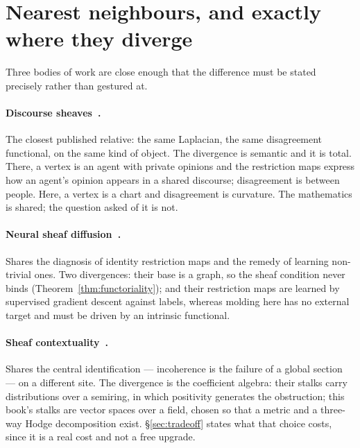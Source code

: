 \begin{center}
\begin{tikzpicture}
\end{tikzpicture}
\label{fig:litgraph}
\end{center}

\section{Nearest neighbours, and exactly where they diverge}
\label{sec:neighbours}

Three bodies of work are close enough that the difference must be stated
precisely rather than gestured at.

\paragraph{Discourse sheaves~\cite{HansenGhristOpinion}.} The closest
published relative: the same Laplacian, the same disagreement functional, on
the same kind of object. The divergence is semantic and it is total. There, a
vertex is an agent with private opinions and the restriction maps express how
an agent's opinion appears in a shared discourse; disagreement is between
people. Here, a vertex is a chart and disagreement is curvature. The
mathematics is shared; the question asked of it is not.

\paragraph{Neural sheaf diffusion~\cite{BodnarSheaf}.} Shares the diagnosis of
identity restriction maps and the remedy of learning non-trivial ones. Two
divergences: their base is a graph, so the sheaf condition never binds
(Theorem~\ref{thm:functoriality}); and their restriction maps are learned by
supervised gradient descent against labels, whereas molding here has no
external target and must be driven by an intrinsic functional.

\paragraph{Sheaf contextuality~\cite{AbramskyBrandenburger}.} Shares the
central identification --- incoherence is the failure of a global section ---
on a different site. The divergence is the coefficient algebra: their stalks
carry distributions over a semiring, in which positivity generates the
obstruction; this book's stalks are vector spaces over a field, chosen so that
a metric and a three-way Hodge decomposition exist. \S\ref{sec:tradeoff}
states what that choice costs, since it is a real cost and not a free
upgrade.

